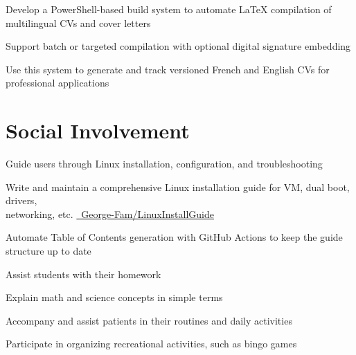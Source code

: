 \documentclass[letterpaper,10pt]{article}
\begin{document}
  \begin{resume_list}
  \item Develop a PowerShell-based build system to automate LaTeX compilation of multilingual CVs and cover letters 
  \item Support batch or targeted compilation with optional digital signature embedding
  \item Use this system to generate and track versioned French and English CVs for professional applications
  \end{resume_list}


  \section{Social Involvement}
  \begin{resume_list}
    \item Guide users through Linux installation, configuration, and troubleshooting
    \item Write and maintain a comprehensive Linux installation guide for VM, dual boot, drivers,\\ networking, etc. {\small \href{https://github.com/George-Fam/LinuxInstallGuide}{\faGithubSquare\ George-Fam/LinuxInstallGuide}}
    \item Automate Table of Contents generation with GitHub Actions to keep the guide structure up to date
  \end{resume_list}

  \begin{resume_list}
    \item Assist students with their homework
    \item Explain math and science concepts in simple terms
  \end{resume_list}
  
\begin{resume_list}
    \item Accompany and assist patients in their routines and daily activities
    \item Participate in organizing recreational activities, such as bingo games
\end{resume_list}
\end{document}
